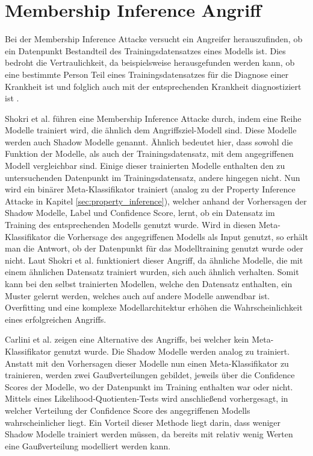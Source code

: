 \section{Membership Inference Angriff}\label{sec:membership_inference}

Bei der Membership Inference Attacke versucht ein Angreifer herauszufinden, ob ein Datenpunkt Bestandteil des Trainingsdatensatzes eines Modells ist. 
Dies bedroht die Vertraulichkeit, da beispielsweise herausgefunden werden kann, ob eine bestimmte Person Teil eines Trainingsdatensatzes für die Diagnose einer Krankheit ist und folglich auch mit der entsprechenden Krankheit diagnostiziert ist \cite{P-2}.

Shokri et al. \cite{P-2} führen eine Membership Inference Attacke durch, indem eine Reihe Modelle trainiert wird, die ähnlich dem Angriffsziel-Modell sind.
Diese Modelle werden auch Shadow Modelle genannt.
Ähnlich bedeutet hier, dass sowohl die Funktion der Modelle, als auch der Trainingsdatensatz, mit dem angegriffenen Modell vergleichbar sind.
Einige dieser trainierten Modelle enthalten den zu untersuchenden Datenpunkt im Trainingsdatensatz, andere hingegen nicht.
Nun wird ein binärer Meta-Klassifikator trainiert (analog zu der Property Inference Attacke in Kapitel \ref{sec:property_inference}), welcher anhand der Vorhersagen der Shadow Modelle, Label und Confidence Score, lernt, ob ein Datensatz im Training des entsprechenden Modells genutzt wurde.
Wird in diesen Meta-Klassifikator die Vorhersage des angegriffenen Modells als Input genutzt, so erhält man die Antwort, ob der Datenpunkt für das Modelltraining genutzt wurde oder nicht.
Laut Shokri et al. \cite{P-2} funktioniert dieser Angriff, da ähnliche Modelle, die mit einem ähnlichen Datensatz trainiert wurden, sich auch ähnlich verhalten. 
Somit kann bei den selbst trainierten Modellen, welche den Datensatz enthalten, ein Muster gelernt werden, welches auch auf andere Modelle anwendbar ist. 
Overfitting und eine komplexe Modellarchitektur erhöhen die Wahrscheinlichkeit eines erfolgreichen Angriffs.

Carlini et al. \cite{P-13} zeigen eine Alternative des Angriffs, bei welcher kein Meta-Klassifikator genutzt wurde.
Die Shadow Modelle werden analog zu \cite{P-2} trainiert. 
Anstatt mit den Vorhersagen dieser Modelle nun einen Meta-Klassifikator zu trainieren, werden zwei Gaußverteilungen gebildet, jeweils über die Confidence Scores der Modelle, wo der Datenpunkt im Training enthalten war oder nicht.
Mittels eines Likelihood-Quotienten-Tests wird anschließend vorhergesagt, in welcher Verteilung der Confidence Score des angegriffenen Modells wahrscheinlicher liegt.
Ein Vorteil dieser Methode liegt darin, dass weniger Shadow Modelle trainiert werden müssen, da bereits mit relativ wenig Werten eine Gaußverteilung modelliert werden kann.


